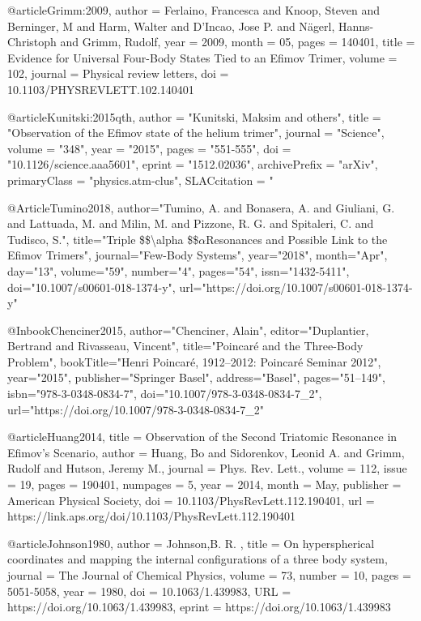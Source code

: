 @article{Grimm:2009,
	author = {Ferlaino, Francesca and Knoop, Steven and Berninger, M and Harm, Walter and D'Incao, Jose P. and N{\"a}gerl, Hanns-Christoph and Grimm, Rudolf},
	year = {2009},
	month = {05},
	pages = {140401},
	title = {Evidence for Universal Four-Body States Tied to an Efimov Trimer},
	volume = {102},
	journal = {Physical review letters},
	doi = {10.1103/PHYSREVLETT.102.140401}
}

@article{Kunitski:2015qth,
	author         = "Kunitski, Maksim and others",
	title          = "{Observation of the Efimov state of the helium trimer}",
	journal        = "Science",
	volume         = "348",
	year           = "2015",
	pages          = "551-555",
	doi            = "10.1126/science.aaa5601",
	eprint         = "1512.02036",
	archivePrefix  = "arXiv",
	primaryClass   = "physics.atm-clus",
	SLACcitation   = "%
}

@Article{Tumino2018,
	author="Tumino, A.
	and Bonasera, A.
	and Giuliani, G.
	and Lattuada, M.
	and Milin, M.
	and Pizzone, R. G.
	and Spitaleri, C.
	and Tudisco, S.",
	title="Triple {\$}{\$}{\backslash}alpha {\$}{\$}$\alpha$Resonances and Possible Link to the Efimov Trimers",
	journal="Few-Body Systems",
	year="2018",
	month="Apr",
	day="13",
	volume="59",
	number="4",
	pages="54",
	issn="1432-5411",
	doi="10.1007/s00601-018-1374-y",
	url="https://doi.org/10.1007/s00601-018-1374-y"
}

@Inbook{Chenciner2015,
	author="Chenciner, Alain",
	editor="Duplantier, Bertrand
	and Rivasseau, Vincent",
	title="Poincar{\'e} and the Three-Body Problem",
	bookTitle="Henri Poincar{\'e}, 1912--2012: Poincar{\'e} Seminar 2012",
	year="2015",
	publisher="Springer Basel",
	address="Basel",
	pages="51--149",
	isbn="978-3-0348-0834-7",
	doi="10.1007/978-3-0348-0834-7_2",
	url="https://doi.org/10.1007/978-3-0348-0834-7_2"
}

@article{Huang2014,
	title = {Observation of the Second Triatomic Resonance in Efimov's Scenario},
	author = {Huang, Bo and Sidorenkov, Leonid A. and Grimm, Rudolf and Hutson, Jeremy M.},
	journal = {Phys. Rev. Lett.},
	volume = {112},
	issue = {19},
	pages = {190401},
	numpages = {5},
	year = {2014},
	month = {May},
	publisher = {American Physical Society},
	doi = {10.1103/PhysRevLett.112.190401},
	url = {https://link.aps.org/doi/10.1103/PhysRevLett.112.190401}
}

@article{Johnson1980,
	author = {Johnson,B. R. },
	title = {On hyperspherical coordinates and mapping the internal configurations of a three body system},
	journal = {The Journal of Chemical Physics},
	volume = {73},
	number = {10},
	pages = {5051-5058},
	year = {1980},
	doi = {10.1063/1.439983},
	URL = {https://doi.org/10.1063/1.439983},
	eprint = {https://doi.org/10.1063/1.439983}
	}

